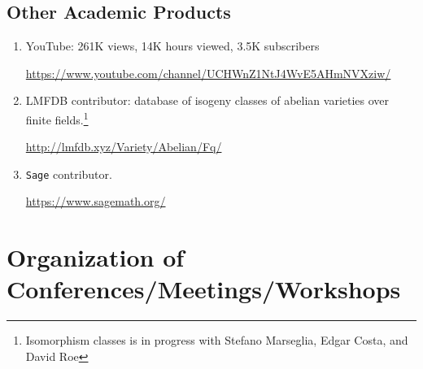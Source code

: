 \documentclass[a4paper,10pt]{article}
\begin{document}
\subsection*{Other Academic Products}
\begin{enumerate}
	\item YouTube: 261K views, 14K hours viewed, 3.5K subscribers
	\begin{center}
		 \url{https://www.youtube.com/channel/UCHWnZ1NtJ4WvE5AHmNVXziw/}
	\end{center}
	\item LMFDB contributor: database of isogeny classes of abelian varieties over finite fields.\footnote{Isomorphism classes is in progress with Stefano Marseglia, Edgar Costa, and David Roe}
	 \begin{center}
	 	\url{http://lmfdb.xyz/Variety/Abelian/Fq/}
	 \end{center}
	\item \texttt{Sage} contributor. 
	\begin{center}
			\url{https://www.sagemath.org/}
	\end{center}
\end{enumerate}

\section*{Organization of Conferences/Meetings/Workshops}
\end{document}
